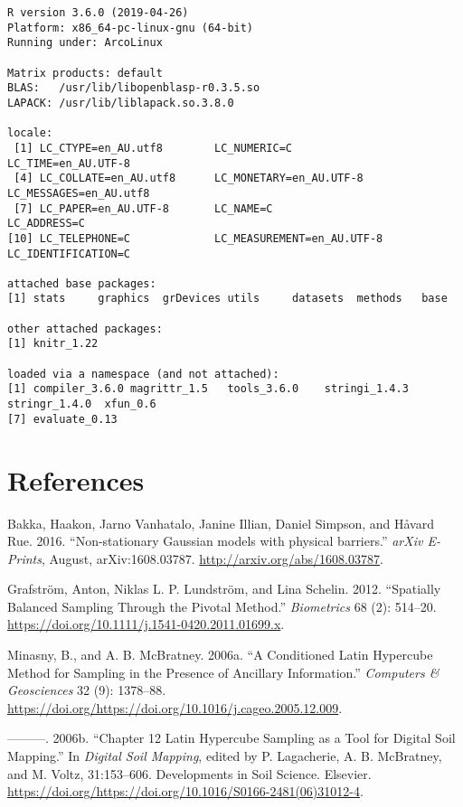 \documentclass[a4paper]{article}
\begin{document}
\begin{verbatim}
R version 3.6.0 (2019-04-26)
Platform: x86_64-pc-linux-gnu (64-bit)
Running under: ArcoLinux

Matrix products: default
BLAS:   /usr/lib/libopenblasp-r0.3.5.so
LAPACK: /usr/lib/liblapack.so.3.8.0

locale:
 [1] LC_CTYPE=en_AU.utf8        LC_NUMERIC=C               LC_TIME=en_AU.UTF-8       
 [4] LC_COLLATE=en_AU.utf8      LC_MONETARY=en_AU.UTF-8    LC_MESSAGES=en_AU.utf8    
 [7] LC_PAPER=en_AU.UTF-8       LC_NAME=C                  LC_ADDRESS=C              
[10] LC_TELEPHONE=C             LC_MEASUREMENT=en_AU.UTF-8 LC_IDENTIFICATION=C       

attached base packages:
[1] stats     graphics  grDevices utils     datasets  methods   base     

other attached packages:
[1] knitr_1.22

loaded via a namespace (and not attached):
[1] compiler_3.6.0 magrittr_1.5   tools_3.6.0    stringi_1.4.3  stringr_1.4.0  xfun_0.6      
[7] evaluate_0.13 
\end{verbatim}

\hypertarget{references}{%
\section*{References}\label{references}}

\hypertarget{refs}{}
\leavevmode\hypertarget{ref-Bakka-2016-1608}{}%
Bakka, Haakon, Jarno Vanhatalo, Janine Illian, Daniel Simpson, and
Håvard Rue. 2016. ``Non-stationary Gaussian models with physical
barriers.'' \emph{arXiv E-Prints}, August, arXiv:1608.03787.
\url{http://arxiv.org/abs/1608.03787}.

\leavevmode\hypertarget{ref-Grafstrom-2012}{}%
Grafström, Anton, Niklas L. P. Lundström, and Lina Schelin. 2012.
``Spatially Balanced Sampling Through the Pivotal Method.''
\emph{Biometrics} 68 (2): 514--20.
\url{https://doi.org/10.1111/j.1541-0420.2011.01699.x}.

\leavevmode\hypertarget{ref-Minasny-2006-1378}{}%
Minasny, B., and A. B. McBratney. 2006a. ``A Conditioned Latin Hypercube
Method for Sampling in the Presence of Ancillary Information.''
\emph{Computers \& Geosciences} 32 (9): 1378--88.
\url{https://doi.org/https://doi.org/10.1016/j.cageo.2005.12.009}.

\leavevmode\hypertarget{ref-Minasny-2006-153}{}%
---------. 2006b. ``Chapter 12 Latin Hypercube Sampling as a Tool for
Digital Soil Mapping.'' In \emph{Digital Soil Mapping}, edited by P.
Lagacherie, A. B. McBratney, and M. Voltz, 31:153--606. Developments in
Soil Science. Elsevier.
\url{https://doi.org/https://doi.org/10.1016/S0166-2481(06)31012-4}.
\end{document}
